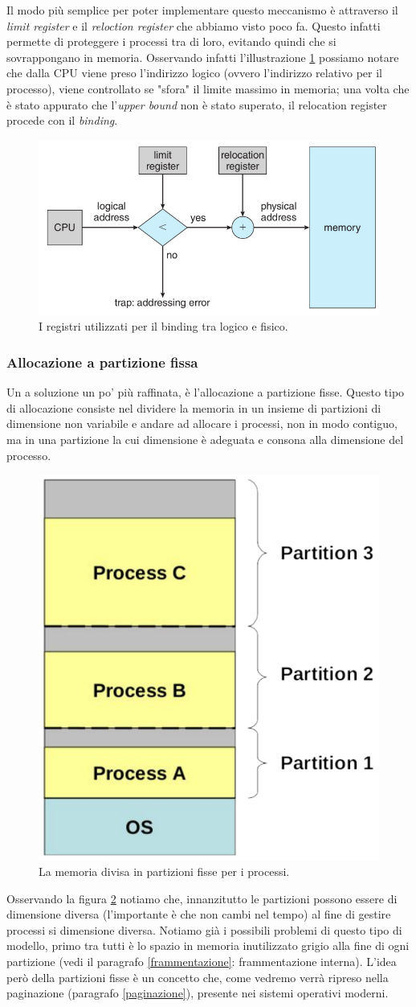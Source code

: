 Il modo più semplice per poter implementare questo meccanismo è attraverso il \textit{limit register} e il \textit{reloction register} che abbiamo visto poco fa. Questo infatti permette di proteggere i processi tra di loro, evitando quindi che si sovrappongano in memoria. Osservando infatti l'illustrazione \ref{fig:relocation_register_allocation} possiamo notare che dalla CPU viene preso l'indirizzo logico (ovvero l'indirizzo relativo per il processo), viene controllato se "sfora" il limite massimo in memoria; una volta che è stato appurato che l'\textit{upper bound} non è stato superato, il relocation register procede con il \textit{binding}.
\begin{figure}[h]
    \centering
    \includegraphics[width = .5\textwidth]{../res/imgs/main memory/relocation_register_allocation.png}
    \caption{I registri utilizzati per il binding tra logico e fisico.}
    \label{fig:relocation_register_allocation}
\end{figure}

% 
\subsubsection{Allocazione a partizione fissa}\label{partizione_fissa}
Un a soluzione un po' più raffinata, è l'allocazione a partizione fisse. Questo tipo di allocazione consiste nel dividere la memoria in un insieme di partizioni di dimensione non variabile e andare ad allocare i processi, non in modo contiguo, ma in una partizione la cui dimensione è adeguata e consona alla dimensione del processo. 
\begin{figure}[h]
    \centering
    \includegraphics[width = .28\textwidth]{../res/imgs/main memory/fixed_partition.png}
    \caption{La memoria divisa in partizioni fisse per i processi.}
    \label{fig:fixed_partition}
\end{figure}
Osservando la figura \ref{fig:fixed_partition} notiamo che, innanzitutto le partizioni possono essere di dimensione diversa (l'importante è che non cambi nel tempo) al fine di gestire processi si dimensione diversa. Notiamo già i possibili problemi di questo tipo di modello, primo tra tutti è lo spazio in memoria inutilizzato grigio alla fine di ogni partizione (vedi il paragrafo \ref{frammentazione}: frammentazione interna). L'idea però della partizioni fisse è un concetto che, come vedremo verrà ripreso nella paginazione (paragrafo \ref{paginazione}), presente nei sistemi operativi moderni.

